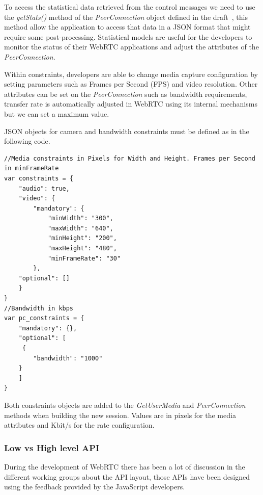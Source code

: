 
To access the statistical data retrieved from the control messages we need to use the {\it getStats()} method of the {\it PeerConnection} object defined in the draft~\cite{editorWebRTCdraft}, this method allow the application to access that data in a JSON format that might require some post-processing. Statistical models are useful for the developers to monitor the status of their WebRTC applications and adjust the attributes of the {\it PeerConnection}. 

Within constraints, developers are able to change media capture configuration by setting parameters such as Frames per Second (FPS)  and video resolution. Other attributes can be set on the {\it PeerConnection} such as bandwidth requirements, transfer rate is automatically adjusted in WebRTC using its internal mechanisms but we can set a maximum value. 

JSON objects for camera and bandwidth constraints must be defined as in the following code.

\lstset{language=JavaScript}
\begin{lstlisting}[caption=JSON objects for constraints attributes in WebRTC]
//Media constraints in Pixels for Width and Height. Frames per Second in minFrameRate
var constraints = {
	"audio": true,
 	"video": {
  		"mandatory": {
   			"minWidth": "300",
   			"maxWidth": "640",
   			"minHeight": "200",
   			"maxHeight": "480",
   			"minFrameRate": "30"
  		},
  	"optional": []
 	}
}
//Bandwidth in kbps
var pc_constraints = {
	"mandatory": {},
 	"optional": [
 	 {
   		"bandwidth": "1000"
  	}
 	]
}
\end{lstlisting}

Both constraints objects are added to the {\it GetUserMedia} and {\it PeerConnection} methods when building the new session. Values are in pixels for the media attributes and Kbit/s for the rate configuration.

\subsubsection{Low vs High level API}

During the development of WebRTC there has been a lot of discussion in the different working groups about the API layout, those APIs have been designed using the feedback provided by the JavaScript developers.

